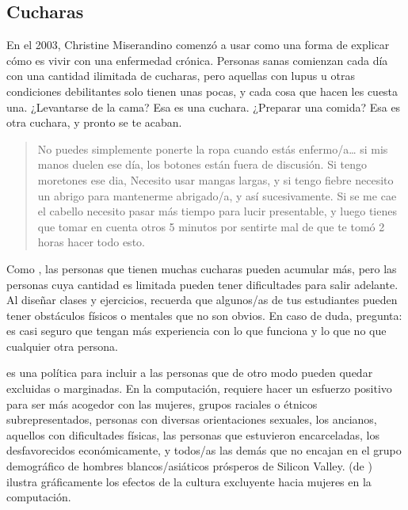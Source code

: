\subsection*{Cucharas}

En el 2003,
Christine Miserandino comenzó a usar 
como una forma de explicar cómo es vivir con una enfermedad crónica.
Personas sanas comienzan cada día con una cantidad ilimitada de cucharas,
pero aquellas con lupus u otras condiciones debilitantes solo tienen unas pocas,
y cada cosa que hacen les cuesta una.
¿Levantarse de la cama?
Esa es una cuchara.
¿Preparar una comida?
Esa es otra cuchara, y pronto se te acaban.

\begin{quote}

  No puedes simplemente ponerte la ropa cuando estás enfermo/a{\dots}
  si mis manos duelen ese día, los botones están fuera de discusión.
  Si tengo moretones ese dia,
  Necesito usar mangas largas,
  y si tengo fiebre necesito un abrigo para mantenerme abrigado/a, y así sucesivamente.
  Si se me cae el cabello necesito pasar más tiempo para lucir presentable,
  y luego tienes que tomar en cuenta otros 5 minutos por sentirte mal
  de que te tomó 2 horas hacer todo esto.

\end{quote}

Como ,
las personas que tienen muchas cucharas pueden acumular más,
pero las personas cuya cantidad es limitada pueden tener dificultades para salir adelante.
Al diseñar clases y ejercicios,
recuerda que algunos/as de tus estudiantes pueden tener obstáculos físicos o mentales que no son obvios.
En caso de duda, pregunta:
es casi seguro que tengan más experiencia con lo que funciona y lo que no que cualquier otra persona.


 es una política para
incluir a las personas que de otro modo pueden quedar excluidas o marginadas.
En la computación,
requiere hacer un esfuerzo positivo para ser más acogedor con las mujeres,
grupos raciales o étnicos subrepresentados,
personas con diversas orientaciones sexuales,
los ancianos,
aquellos con dificultades físicas,
las personas que estuvieron encarceladas,
los desfavorecidos económicamente,
y todos/as las demás que no encajan en el grupo demográfico de hombres blancos/asiáticos prósperos de Silicon Valley.
 (de )
ilustra gráficamente los efectos de la cultura excluyente hacia mujeres en la computación.

